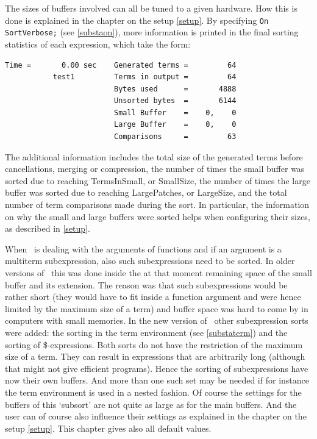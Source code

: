 The sizes of buffers involved can all be tuned to a given hardware. How 
this is done is explained in the chapter on the setup \ref{setup}.
By specifying \texttt{On SortVerbose;} (see
\ref{substaon}), more information is printed in the final sorting statistics of
each expression, which take the form:
\begin{verbatim}
Time =       0.00 sec    Generated terms =         64
           test1         Terms in output =         64
                         Bytes used      =       4888
                         Unsorted bytes  =       6144
                         Small Buffer    =    0,    0
                         Large Buffer    =    0,    0
                         Comparisons     =         63
\end{verbatim}
The additional information includes the total size of the generated terms
before cancellations, merging or compression, the number of times the small
buffer was sorted due to reaching TermsInSmall, or SmallSize, the number of
times the large buffer was sorted due to reaching LargePatches, or LargeSize,
and the total number of term comparisons made during the sort. In particular,
the information on why the small and large buffers were sorted helps when
configuring their sizes, as described in \ref{setup}.

When \FORM\ is dealing with the arguments of 
functions and if an argument is a multiterm subexpression, also such 
subexpressions need to be sorted. In older versions of \FORM\ this was done 
inside the at that moment remaining space of the small buffer and its 
extension. The reason was that such subexpressions would be rather short 
(they would have to fit inside a function argument and were hence limited 
by the maximum size of a term) and buffer space was hard to come by in 
computers with small memories. In the new version of \FORM\ other 
subexpression sorts were added: the sorting in the term environment (see 
\ref{substaterm}) and the sorting of \$-expressions. Both sorts do not have 
the restriction of the maximum size of a term. They can result in 
expressions that are arbitrarily long (although that might not give 
efficient programs). Hence the sorting of subexpressions have now their own 
buffers. And more than one such set may be needed if for instance the term 
environment is used in a nested fashion. Of course the settings for the 
buffers of this `subsort' are not quite as large as for the main buffers. 
And the user can of course also influence their settings as explained in 
the chapter on the setup \ref{setup}. This chapter gives also all default 
values.

